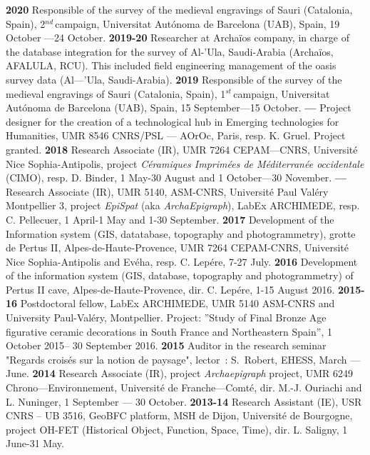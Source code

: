 \documentclass[11pt]{report} %
\begin{document}
\textbf{2020 }Responsible of the survey of the medieval engravings of Sauri (Catalonia, Spain), 2${}^{nd\ }$campaign, Universitat Aut\'{o}noma de Barcelona (UAB), Spain, 19 October ---24 October.\textbf{}
\smallbreak
\textbf{2019-20 }Researcher at Archa\"{i}os company, in charge of the database integration for the survey of Al-'Ula, Saudi-Arabia (Archa\"{i}os, AFALULA, RCU). This included field engineering management of the oasis survey data (Al---'Ula, Saudi-Arabia).
\smallbreak
\textbf{2019 }Responsible of the survey of the medieval engravings of Sauri (Catalonia, Spain), 1${}^{st\ }$campaign, Universitat Aut\'{o}noma de Barcelona (UAB), Spain, 15 September---15 October.\textbf{}
\smallbreak
\textbf{---  }Project designer for the creation of a technological hub in Emerging technologies for Humanities, UMR 8546 CNRS/PSL --- AOrOc, Paris, resp. K. Gruel. Project granted.
\smallbreak
\textbf{2018 }Research Associate (IR), UMR 7264 CEPAM---CNRS, Universit\'{e} Nice Sophia-Antipolis, project \textit{C\'{e}ramiques Imprim\'{e}es de M\'{e}diterran\'{e}e occidentale} (CIMO), resp. D. Binder, 1 May-30 August and 1 October---30 November.
\smallbreak
\textbf{---  }Research Associate (IR), UMR 5140, ASM-CNRS, Universit\'{e} Paul Val\'{e}ry Montpellier 3, project \textit{EpiSpat} (aka \textit{ArchaEpigraph}), LabEx ARCHIMEDE, resp. C. Pellecuer, 1 April-1 May and 1-30 September.
\smallbreak
\textbf{2017 } Development of the Information system (GIS, datatabase, topography and photogrammetry), grotte de Pertus II, Alpes-de-Haute-Provence, UMR 7264 CEPAM-CNRS, Universit\'{e} Nice Sophia-Antipolis and Ev\'{e}ha, resp. C. Lep\'{e}re, 7-27 July.
\smallbreak
\textbf{2016 } Development of the information system (GIS, database, topography and photogrammetry) of Pertus II cave, Alpes-de-Haute-Provence, dir. C. Lep\'{e}re, 1-15 August 2016.
\smallbreak
\textbf{2015-16  }Postdoctoral fellow, LabEx ARCHIMEDE, UMR 5140 ASM-CNRS and University Paul-Val\'{e}ry, Montpellier. Project: ''Study of Final Bronze Age figurative ceramic decorations in South France and Northeastern Spain'', 1 October 2015-- 30 September 2016.
\smallbreak
\textbf{2015 }Auditor in the research seminar "Regards crois\'{e}s sur la notion de paysage", lector~: S.~Robert, EHESS, March --- June.\textbf{}
\smallbreak
\textbf{2014  }Research\textbf{ }Associate (IR), project \textit{Archaepigraph} project, UMR 6249 Chrono---Environnement, Universit\'{e} de Franche---Comt\'{e}, dir. M.-J. Ouriachi and L. Nuninger, 1 September --- 30 October.
\smallbreak
\textbf{2013-14  }Research Assistant (IE), USR CNRS -- UB 3516, GeoBFC platform, MSH de Dijon, Universit\'{e} de Bourgogne, project OH-FET (Historical Object, Function, Space, Time), dir. L. Saligny, 1 June-31 May.
\end{document}
